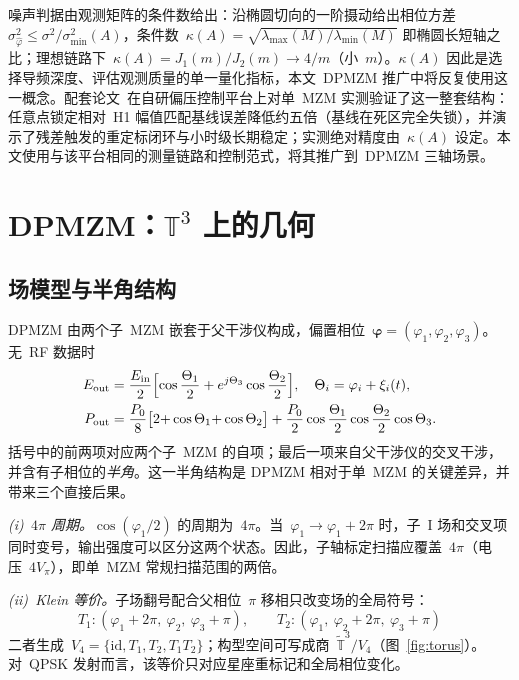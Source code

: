 \documentclass[11pt,journal,onecolumn]{IEEEtran}
\theoremstyle{plain}
\theoremstyle{remark}
\newcommand{\phiv}{\bm{\varphi}}
\begin{document}
噪声判据由观测矩阵的条件数给出：沿椭圆切向的一阶摄动给出相位方差~$\sigma^2_{\hat\varphi}\le\sigma^2/\sigma^2_{\min}(A)$，条件数~$\kappa(A)=\sqrt{\lambda_{\max}(M)/\lambda_{\min}(M)}$ 即椭圆长短轴之比；理想链路下~$\kappa(A)=J_1(m)/J_2(m)\to4/m$（小~$m$）。$\kappa(A)$ 因此是选择导频深度、评估观测质量的单一量化指标，本文~DPMZM 推广中将反复使用这一概念。配套论文~\cite{mzmaffine}在自研偏压控制平台上对单~MZM 实测验证了这一整套结构：任意点锁定相对~H1 幅值匹配基线误差降低约五倍（基线在死区完全失锁），并演示了残差触发的重定标闭环与小时级长期稳定；实测绝对精度由~$\kappa(A)$ 设定。本文使用与该平台相同的测量链路和控制范式，将其推广到~DPMZM 三轴场景。

\section{DPMZM：\texorpdfstring{$\mathbb{T}^3$}{T3} 上的几何}
\label{sec:dpmzm}

\subsection{场模型与半角结构}
DPMZM 由两个子~MZM 嵌套于父干涉仪构成，偏置相位~$\phiv=(\varphi_1,\varphi_2,\varphi_3)$。无~RF 数据时
\begin{align}
E_{\mathrm{out}}&=\frac{E_{\mathrm{in}}}{2}\Bigl[\cos\frac{\Theta_1}{2}
+e^{j\Theta_3}\cos\frac{\Theta_2}{2}\Bigr],\quad \Theta_i=\varphi_i+\xi_i(t),
\nonumber\\
P_{\mathrm{out}}&=\frac{P_0}{8}\bigl[2{+}\cos\Theta_1{+}\cos\Theta_2\bigr]
+\frac{P_0}{2}\cos\frac{\Theta_1}{2}\cos\frac{\Theta_2}{2}\cos\Theta_3.
\label{eq:dpmzm}
\end{align}
括号中的前两项对应两个子~MZM 的自项；最后一项来自父干涉仪的交叉干涉，并含有子相位的\emph{半角}。这一半角结构是 DPMZM 相对于单~MZM 的关键差异，并带来三个直接后果。

\emph{(i)~$4\pi$ 周期。}$\cos(\varphi_1/2)$ 的周期为~$4\pi$。当~$\varphi_1\!\to\!\varphi_1{+}2\pi$ 时，子~I 场和交叉项同时变号，输出强度可以区分这两个状态。因此，子轴标定扫描应覆盖~$4\pi$（电压~$4V_\pi$），即单~MZM 常规扫描范围的两倍。

\emph{(ii)~Klein 等价。}子场翻号配合父相位~$\pi$ 移相只改变场的全局符号：
\begin{equation*}
T_1:(\varphi_1{+}2\pi,\ \varphi_2,\ \varphi_3{+}\pi),\qquad
T_2:(\varphi_1,\ \varphi_2{+}2\pi,\ \varphi_3{+}\pi)
\end{equation*}
二者生成~$V_4=\{\mathrm{id},T_1,T_2,T_1T_2\}$；构型空间可写成商~$\widetilde{\mathbb{T}}^3/V_4$（图~\ref{fig:torus}）。对~QPSK 发射而言，该等价只对应星座重标记和全局相位变化。
\end{document}
